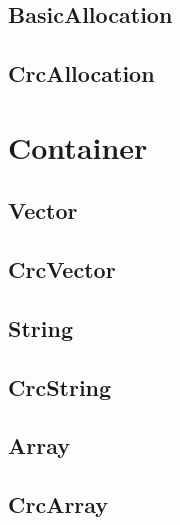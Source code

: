 \documentclass[a4paper,11pt]{article}
\begin{document}
\subsection{BasicAllocation}

\subsection{CrcAllocation}

\section{Container}
\subsection{Vector}
\subsection{CrcVector}
\subsection{String}
\subsection{CrcString}
\subsection{Array}
\subsection{CrcArray}
\end{document}
